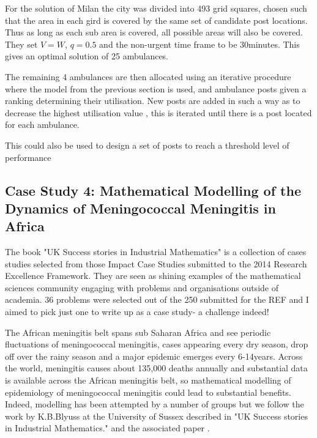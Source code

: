 \documentclass[11pt]{article} %
\begin{document}
 
For the solution of Milan the city was divided into 493 grid squares, chosen such that the area in each gird is covered by the same set of candidate post locations. Thus as long as each sub area is covered, all possible areas will also be covered. They set $ V=W $, $ q=0.5 $ and the non-urgent time frame to be 30minutes. This gives an optimal solution of 25 ambulances.

The remaining 4 ambulances are then allocated using an iterative procedure where the model from the previous section is used, and ambulance posts given  a ranking determining their utilisation. New posts are added in such a way as to decrease the highest utilisation value , this is iterated until there is a post located for each ambulance. 

This could also be used to design a set of posts to reach a threshold level of performance
	\subsection{Case Study 4: Mathematical Modelling of the Dynamics of Meningococcal Meningitis in Africa  }
The book "UK Success stories in Industrial Mathematics" \cite{Aston2016} is a collection of cases studies selected from those Impact Case Studies submitted to the 2014 Research Excellence Framework. They are seen as shining examples of the mathematical sciences community engaging with problems and organisations outside of academia. 36 problems were selected out of the 250 submitted for the REF and I aimed to pick just one to write up as a case study- a challenge indeed!


The African meningitis belt spans sub Saharan Africa and see periodic fluctuations of meningococcal meningitis, cases appearing every dry season, drop off over the rainy season and a major epidemic emerges every 6-14years. Across the world, meningitis causes about 135,000 deaths annually and substantial data is available across the African meningitis belt, so mathematical modelling of epidemiology of meningococcal meningitis could lead to substantial benefits. Indeed, modelling has been attempted by a number of groups but we follow the work by K.B.Blyuss at the University of Sussex described in "UK Success stories in Industrial Mathematics." and the associated paper \cite{Irving2012}.
\end{document}
